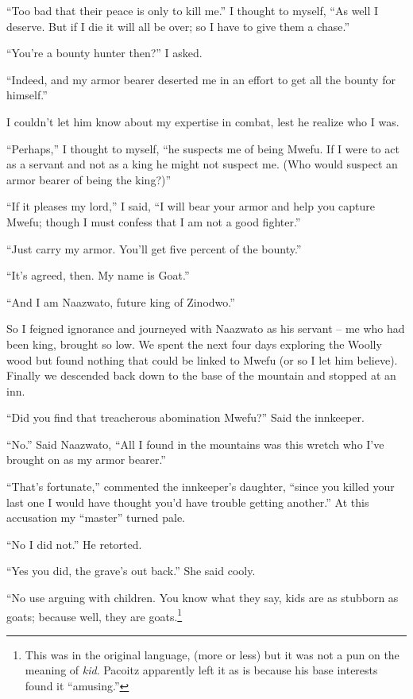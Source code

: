 ``Too bad that their peace is only to kill me.'' I thought to myself, ``As well I deserve. But if I die it will all be over; so I have to give them a chase.''

``You're a bounty hunter then?'' I asked.

``Indeed, and my armor bearer deserted me in an effort to get all the bounty for himself.'' 

I couldn't let him know about my expertise in combat, lest he realize who I was.

``Perhaps,'' I thought to myself, ``he suspects me of being Mwefu. If I were to act as a servant and not as a king he might not suspect me. (Who would suspect an armor bearer of being the king?)''

``If it pleases my lord,'' I said, ``I will bear your armor and help you capture Mwefu; though I must confess that I am not a good fighter.''

``Just carry my armor. You'll get five percent of the bounty.''

``It's agreed, then. My name is Goat.''

``And I am Naazwato, future king of Zinodwo.''

So I feigned ignorance and journeyed with Naazwato as his servant -- me who had been king, brought so low. We spent the next four days exploring the Woolly wood but found nothing that could be linked to Mwefu (or so I let him believe). Finally we descended back down to the base of the mountain and stopped at an inn.

``Did you find that treacherous abomination Mwefu?'' Said the innkeeper.

``No.'' Said Naazwato, ``All I found in the mountains was this wretch who I've brought on as my armor bearer.''

``That's fortunate,'' commented the innkeeper's daughter, ``since you killed your last one I would have thought you'd have trouble getting another.'' At this accusation my ``master'' turned pale.

``No I did not.'' He retorted.

``Yes you did, the grave's out back.'' She said cooly.

``No use arguing with children. You know what they say, kids are as stubborn as goats; because well, they are goats.\footnote{This was in the original language, (more or less) but it was not a pun on the meaning of \emph{kid}. Pacoitz apparently left it as is because his base interests found it ``amusing.''}

